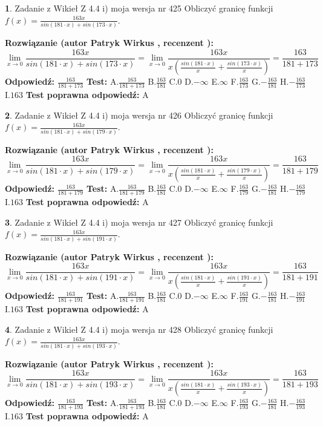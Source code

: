 \documentclass[12pt, a4paper]{article}
\theoremstyle{definition} %
\newtheorem{zad}{}
\newcommand{\zadStart}[1]{\begin{zad}#1\newline}
\newcommand{\zadStop}{\end{zad}}
\newcommand{\rozwStart}[2]{\noindent \textbf{Rozwiązanie (autor #1 , recenzent #2): }\newline}
\newcommand{\rozwStop}{\newline}
\newcommand{\odpStart}{\noindent \textbf{Odpowiedź:}\newline}
\newcommand{\odpStop}{\newline}
\newcommand{\testStart}{\noindent \textbf{Test:}\newline}
\newcommand{\testStop}{\newline}
\newcommand{\kluczStart}{\noindent \textbf{Test poprawna odpowiedź:}\newline}
\newcommand{\kluczStop}{\newline}
\begin{document}
\zadStart{Zadanie z Wikieł Z 4.4 i) moja wersja nr 425}
Obliczyć granicę funkcji $f(x)=\frac{163x}{sin(181\cdot x) +sin(173\cdot x)}$.
\zadStop
\rozwStart{Patryk Wirkus}{}
$$\lim\limits_{x\to 0}\frac{163x}{sin(181\cdot x) +sin(173\cdot x)}=\lim\limits_{x\to 0}\frac{163x}{x(\frac{sin(181\cdot x)}{x}+\frac{sin(173\cdot x)}{x})}=\frac{163}{181+173}$$
\rozwStop
\odpStart
$\frac{163}{181+173}$
\odpStop
\testStart
A.$\frac{163}{181+173}$
B.$\frac{163}{181}$
C.$0$
D.$-\infty$
E.$\infty$
F.$\frac{163}{173}$
G.$-\frac{163}{181}$
H.$-\frac{163}{173}$
I.$163$
\testStop
\kluczStart
A
\kluczStop



\zadStart{Zadanie z Wikieł Z 4.4 i) moja wersja nr 426}
Obliczyć granicę funkcji $f(x)=\frac{163x}{sin(181\cdot x) +sin(179\cdot x)}$.
\zadStop
\rozwStart{Patryk Wirkus}{}
$$\lim\limits_{x\to 0}\frac{163x}{sin(181\cdot x) +sin(179\cdot x)}=\lim\limits_{x\to 0}\frac{163x}{x(\frac{sin(181\cdot x)}{x}+\frac{sin(179\cdot x)}{x})}=\frac{163}{181+179}$$
\rozwStop
\odpStart
$\frac{163}{181+179}$
\odpStop
\testStart
A.$\frac{163}{181+179}$
B.$\frac{163}{181}$
C.$0$
D.$-\infty$
E.$\infty$
F.$\frac{163}{179}$
G.$-\frac{163}{181}$
H.$-\frac{163}{179}$
I.$163$
\testStop
\kluczStart
A
\kluczStop



\zadStart{Zadanie z Wikieł Z 4.4 i) moja wersja nr 427}
Obliczyć granicę funkcji $f(x)=\frac{163x}{sin(181\cdot x) +sin(191\cdot x)}$.
\zadStop
\rozwStart{Patryk Wirkus}{}
$$\lim\limits_{x\to 0}\frac{163x}{sin(181\cdot x) +sin(191\cdot x)}=\lim\limits_{x\to 0}\frac{163x}{x(\frac{sin(181\cdot x)}{x}+\frac{sin(191\cdot x)}{x})}=\frac{163}{181+191}$$
\rozwStop
\odpStart
$\frac{163}{181+191}$
\odpStop
\testStart
A.$\frac{163}{181+191}$
B.$\frac{163}{181}$
C.$0$
D.$-\infty$
E.$\infty$
F.$\frac{163}{191}$
G.$-\frac{163}{181}$
H.$-\frac{163}{191}$
I.$163$
\testStop
\kluczStart
A
\kluczStop



\zadStart{Zadanie z Wikieł Z 4.4 i) moja wersja nr 428}
Obliczyć granicę funkcji $f(x)=\frac{163x}{sin(181\cdot x) +sin(193\cdot x)}$.
\zadStop
\rozwStart{Patryk Wirkus}{}
$$\lim\limits_{x\to 0}\frac{163x}{sin(181\cdot x) +sin(193\cdot x)}=\lim\limits_{x\to 0}\frac{163x}{x(\frac{sin(181\cdot x)}{x}+\frac{sin(193\cdot x)}{x})}=\frac{163}{181+193}$$
\rozwStop
\odpStart
$\frac{163}{181+193}$
\odpStop
\testStart
A.$\frac{163}{181+193}$
B.$\frac{163}{181}$
C.$0$
D.$-\infty$
E.$\infty$
F.$\frac{163}{193}$
G.$-\frac{163}{181}$
H.$-\frac{163}{193}$
I.$163$
\testStop
\kluczStart
A
\kluczStop
\end{document}
